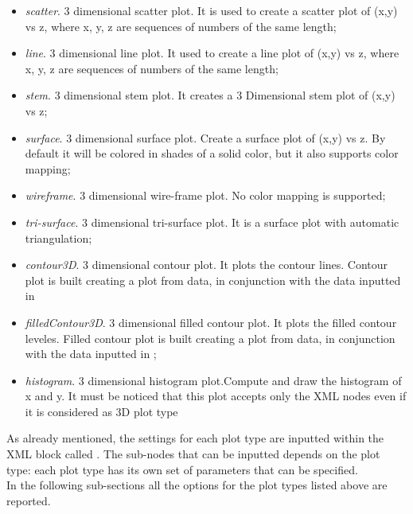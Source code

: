 \begin{itemize}
       \begin{itemize}
    \item \textit{scatter}.
    3 dimensional scatter plot.
    It is used to create a scatter plot of (x,y) vs z, where x, y, z are
    sequences of numbers of the same length;
    \item \textit{line}.
    3 dimensional line plot.
    It used to create a line plot of (x,y) vs z, where x, y, z are sequences of
    numbers of the same length;
    \item \textit{stem}.
    3 dimensional stem plot.
    It creates a 3 Dimensional stem plot of (x,y) vs z;
    \item \textit{surface}.
    3 dimensional surface plot.
    Create a surface plot of (x,y) vs z.
    By default it will be colored in shades of a solid color, but it also
    supports color mapping;
    \item \textit{wireframe}.
    3 dimensional wire-frame plot.
    No color mapping is supported;
    \item \textit{tri-surface}.
    3 dimensional tri-surface plot.
    It is a surface plot with automatic triangulation;
    \item \textit{contour3D}.
    3 dimensional contour plot.
    It plots the contour lines.
    Contour plot is built creating a plot from  data, in
    conjunction with the data inputted in 
    \item \textit{filledContour3D}.
    3 dimensional filled contour plot.
    It plots the filled contour leveles.
    Filled contour plot is built creating a plot from  data,
    in conjunction with the data inputted in ;
    \item \textit{histogram}.
    3 dimensional histogram plot.Compute and draw the histogram of x and y.
    It must be noticed that this plot accepts only the XML nodes 
    even if it is considered as 3D plot type
       \end{itemize}
\end{itemize}
As already mentioned, the settings for each plot type are inputted within the
XML block called .
%
The sub-nodes that can be inputted depends on the plot type: each plot type has
its own set of parameters that can be specified.
%
\\In the following sub-sections all the options for the plot types listed above
are reported.

